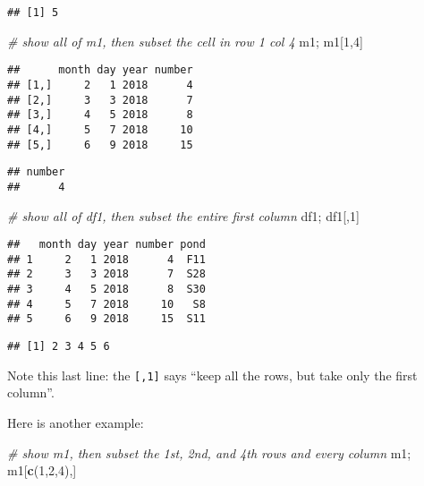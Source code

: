 \documentclass[]{book}
\newenvironment{Shaded}{\begin{snugshade}}{\end{snugshade}}
\newcommand{\KeywordTok}[1]{\textcolor[rgb]{0.13,0.29,0.53}{\textbf{#1}}}
\newcommand{\DecValTok}[1]{\textcolor[rgb]{0.00,0.00,0.81}{#1}}
\newcommand{\CommentTok}[1]{\textcolor[rgb]{0.56,0.35,0.01}{\textit{#1}}}
\newcommand{\NormalTok}[1]{#1}
\theoremstyle{definition}
\theoremstyle{definition}
\theoremstyle{definition}
\theoremstyle{remark}
\begin{document}
\begin{verbatim}
## [1] 5
\end{verbatim}

\begin{Shaded}
\begin{Highlighting}[]
\CommentTok{# show all of m1, then subset the cell in row 1 col 4 }
\NormalTok{m1; m1[}\DecValTok{1}\NormalTok{,}\DecValTok{4}\NormalTok{]}
\end{Highlighting}
\end{Shaded}

\begin{verbatim}
##      month day year number
## [1,]     2   1 2018      4
## [2,]     3   3 2018      7
## [3,]     4   5 2018      8
## [4,]     5   7 2018     10
## [5,]     6   9 2018     15
\end{verbatim}

\begin{verbatim}
## number 
##      4
\end{verbatim}

\begin{Shaded}
\begin{Highlighting}[]
\CommentTok{# show all of df1, then subset the entire first column}
\NormalTok{df1; df1[,}\DecValTok{1}\NormalTok{]}
\end{Highlighting}
\end{Shaded}

\begin{verbatim}
##   month day year number pond
## 1     2   1 2018      4  F11
## 2     3   3 2018      7  S28
## 3     4   5 2018      8  S30
## 4     5   7 2018     10   S8
## 5     6   9 2018     15  S11
\end{verbatim}

\begin{verbatim}
## [1] 2 3 4 5 6
\end{verbatim}

Note this last line: the \texttt{{[},1{]}} says ``keep all the rows, but
take only the first column''.

Here is another example:

\begin{Shaded}
\begin{Highlighting}[]
\CommentTok{# show m1, then subset the 1st, 2nd, and 4th rows and every column}
\NormalTok{m1; m1[}\KeywordTok{c}\NormalTok{(}\DecValTok{1}\NormalTok{,}\DecValTok{2}\NormalTok{,}\DecValTok{4}\NormalTok{),]}
\end{Highlighting}
\end{Shaded}
\end{document}

